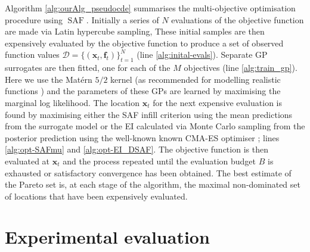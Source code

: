 \documentclass[conference]{IEEEtran}
\newcommand{\ninitialevaluations}{N}
\newcommand{\nbudget}{B}
\newcommand{\nobj}{M}
\DeclareMathOperator*{\saf}{SAF}
\newcommand\ei{EI\xspace}
\newcommand\gp{GP\xspace}
\newcommand\gps{GPs\xspace}
\newcommand{\bx}{\mathbf{x}}
\newcommand{\bff}{\mathbf{f}}
\newcommand{\data}{\mathcal{D}}
\begin{document}
Algorithm  \ref{alg:ourAlg_pseudocde} summarises the multi-objective
optimisation procedure using $\saf$.   
Initially a series of $\ninitialevaluations$ evaluations of the objective
function are made via  Latin hypercube sampling, These initial samples are
then expensively evaluated by the objective function to produce a set of
observed function values  $\data = \{(\bx_t,
\bff_t)\}_{t=1}^{\ninitialevaluations}$ (line \ref{alg:inital-evals}).
Separate \gp surrogates are then fitted, one for each of the $\nobj$
objectives (line \ref{alg:train_gp}). Here we use the Mat{\'e}rn $5/2$ kernel (as recommended for modelling realistic functions \cite{snoek2012practical}) and the parameters of these \gps are
learned by maximising the marginal log likelihood.
 The location $\bx_t$  for the next expensive
evaluation is found by maximising either the SAF infill criterion using the mean predictions from the
surrogate model or the \ei calculated via Monte Carlo sampling from the
posterior prediction using the well-known known CMA-ES optimiser
 \cite{hansen2003reducing}; lines \ref{alg:opt-SAFmu} and \ref{alg:opt-EI_DSAF}. 
  The objective function is then evaluated at
 $\mathbf{x}_t$ and the process repeated until the evaluation budget $\nbudget$ is
 exhausted or satisfactory convergence has been obtained.  The best
 estimate of the Pareto set is, at each stage of the algorithm, the maximal
 non-dominated set of locations that have been expensively evaluated.
 










\section{Experimental evaluation}
\label{sec:exper-eval}
\end{document}
